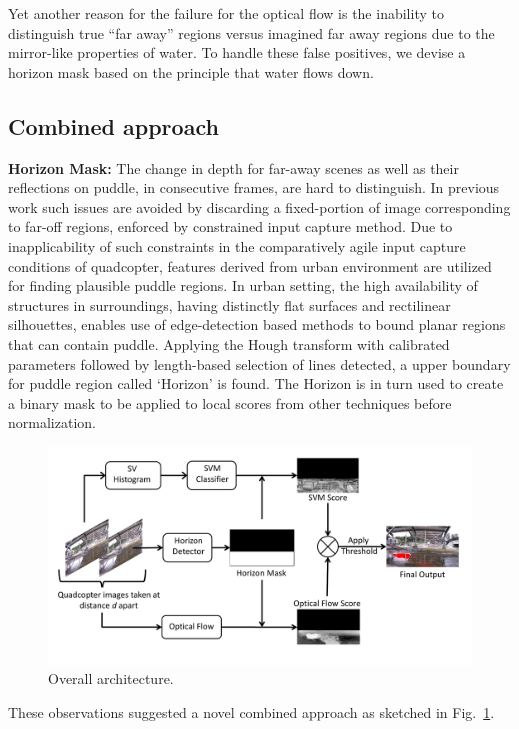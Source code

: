 Yet another reason for the failure for the optical flow is the
inability to distinguish true ``far away'' regions versus imagined far
away regions due to the mirror-like properties of water.  To handle
these false positives, we devise a horizon mask based on the principle
that water flows down.

\subsection{Combined approach}
\textbf{Horizon Mask:} The change in depth for far-away scenes as well
as their reflections on puddle, in consecutive frames, are hard to
distinguish. In previous work \cite{rankin11} such issues are avoided
by discarding a fixed-portion of image corresponding to far-off
regions, enforced by constrained input capture method. Due to
inapplicability of such constraints in the comparatively agile input
capture conditions of quadcopter, features derived from urban
environment are utilized for finding plausible puddle regions. In
urban setting, the high availability of structures in surroundings,
having distinctly flat surfaces and rectilinear silhouettes, enables
use of edge-detection based methods to bound planar regions that can
contain puddle. Applying the Hough transform with calibrated
parameters followed by length-based selection of lines detected, a
upper boundary for puddle region called `Horizon' is found. The
Horizon is in turn used to create a binary mask to be applied to local
scores from other techniques before normalization.


\begin{figure}[h!]
  \centering
  \includegraphics[width=0.9\linewidth]{figures/stagnantWater/overall_workflow.pdf}
  \caption{Overall architecture.}
  \label{fig:workflow}
\end{figure}

These observations suggested a novel combined approach as sketched
in Fig.~\ref{fig:workflow}.


